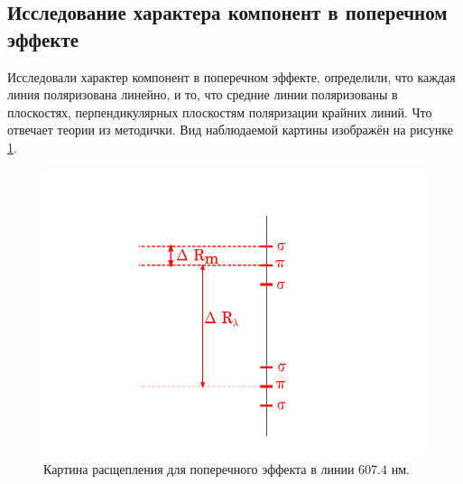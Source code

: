 \documentclass[12pt]{article}
\begin{document}
	\subsection{Исследование характера компонент в поперечном эффекте}
	Исследовали характер компонент в поперечном эффекте, определили, что каждая линия поляризована линейно, и то, что средние линии поляризованы в плоскостях, перпендикулярных плоскостям поляризации крайних линий. Что отвечает теории из методички. Вид наблюдаемой картины изображён на рисунке \ref{fig:figure3}.
	\begin{figure}[htbp]
	 	\centering
	 	\includegraphics[width=\linewidth]{../images/3}
	 	\caption{Картина расщепления для поперечного эффекта в линии 607.4 нм.}
	 	\label{fig:figure3}
	 \end{figure}
\end{document}
